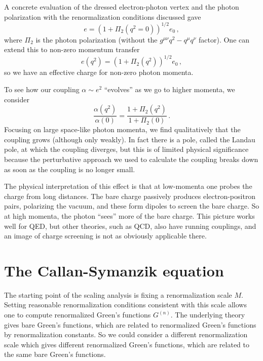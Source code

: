 \documentclass[12pt]{memoir}
\begin{document}
A concrete evaluation of the dressed electron-photon vertex and the photon polarization
with the renormalization conditions discussed gave
\begin{equation}
  e = (1 + \Pi_2(q^2=0))^{1/2}e_0\,,
\end{equation}
where $\Pi_2$ is the photon polarization (without the $g^{\mu\nu}q^2 - q^{\mu}q^{\nu}$ factor).
One can extend this to non-zero momentum transfer
\begin{equation}
  e(q^2) = (1 + \Pi_2(q^2))^{1/2}e_0\,,
\end{equation}
so we have an effective charge for non-zero photon momenta.

To see how our coupling $\alpha \sim e^2$ ``evolves'' as we go to higher momenta, we consider
\begin{equation}
  \frac{\alpha(q^2)}{\alpha(0)} = \frac{1 + \Pi_2(q^2)}{1 + \Pi_2(0)}\,.
\end{equation}
Focusing on large space-like photon momenta,
we find qualitatively that the coupling grows (although only weakly).
In fact there is a pole, called the Landau pole, at which the coupling diverges,
but this is of limited physical significance
because the perturbative approach we used to calculate the coupling
breaks down as soon as the coupling is no longer small.

The physical interpretation of this effect is that
at low-momenta one probes the charge from long distances.
The bare charge passively produces electron-positron pairs, polarizing the vacuum,
and these form dipoles to screen the bare charge.
So at high momenta, the photon ``sees'' more of the bare charge.
This picture works well for QED, but other theories, such as QCD, also have running couplings,
and an image of charge screening is not as obviously applicable there.


\section{The Callan-Symanzik equation}

The starting point of the scaling analysis is fixing a renormalization scale $M$.
Setting reasonable renormalization conditions consistent with this scale allows one to compute renormalized Green's functions $G^{(n)}$.
The underlying theory gives bare Green's functions, which are related to renormalized Green's functions by renormalization constants.
So we could consider a different renormalization scale which gives different renormalized Green's functions,
which are related to the same bare Green's functions.
\end{document}
